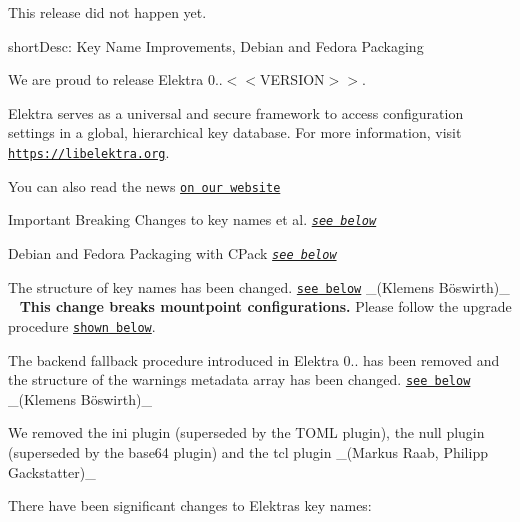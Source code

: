This release did not happen yet.


\begin{DoxyItemize}
\item short\+Desc\+: Key Name Improvements, Debian and Fedora Packaging
\end{DoxyItemize}

We are proud to release Elektra 0..$<$$<$\+V\+E\+R\+S\+I\+O\+N$>$$>$.

Elektra serves as a universal and secure framework to access configuration settings in a global, hierarchical key database. For more information, visit \href{https://libelektra.org}{\tt https\+://libelektra.\+org}.

You can also read the news \href{https://www.libelektra.org/news/0.9.<<VERSION>>-release}{\tt on our website}


\begin{DoxyItemize}
\item Important Breaking Changes to key names et al. {\itshape \href{#hl-1}{\tt see below}}
\item Debian and Fedora Packaging with C\+Pack {\itshape \href{#hl-2}{\tt see below}}
\end{DoxyItemize}


\begin{DoxyItemize}
\item The structure of key names has been changed. \href{#br-1}{\tt see below} \+\_\+(Klemens Böswirth)\+\_\+ ~\newline
 {\bfseries This change breaks mountpoint configurations.} Please follow the upgrade procedure \href{#mountpoint-upgrade}{\tt shown below}.
\item The backend fallback procedure introduced in Elektra 0.. has been removed and the structure of the {\ttfamily warnings} metadata array has been changed. \href{#br-2}{\tt see below} \+\_\+(Klemens Böswirth)\+\_\+
\item We removed the {\ttfamily ini} plugin (superseded by the T\+O\+ML plugin), the {\ttfamily null} plugin (superseded by the base64 plugin) and the {\ttfamily tcl} plugin \+\_\+(\+Markus Raab, Philipp Gackstatter)\+\_\+
\end{DoxyItemize}

There have been significant changes to Elektra\textquotesingle{}s key names\+:


